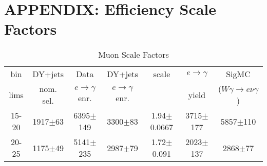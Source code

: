 \chapter{APPENDIX: Efficiency Scale Factors}
\label{sec:SFsTables}



\begin{table}[h]
  \scriptsize
  \begin{center}
  \caption{Muon Scale Factors} 
   \begin{tabular}{|c|c|c|c|c|c|c|}
 bin  & DY+jets    & Data                      & DY+jets & scale & $e\rightarrow\gamma$ & SigMC\\ 
 lims & nom. sel. & $e\rightarrow\gamma$ enr. & $e\rightarrow\gamma$ enr. & & yield & ($W\gamma\rightarrow e\nu\gamma$)\\ \hline
15-20 & 1917$\pm$63 & 6395$\pm$149 & 3300$\pm$83 & 1.94$\pm$0.0667& 3715$\pm$177& 5857$\pm$110 \\ \hline
20-25 & 1175$\pm$49 & 5141$\pm$235 & 2987$\pm$79 & 1.72$\pm$0.091& 2023$\pm$137& 2868$\pm$77 \\ \hline
  \end{tabular}
  \label{tab:EtoGAMMA_0}
  \end{center}
\end{table}

